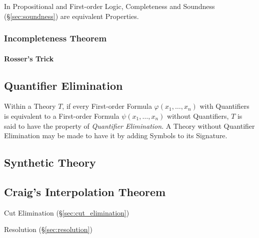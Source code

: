 In Propositional and First-order Logic, Completeness and Soundness
(\S\ref{sec:soundness}) are equivalent Properties.



\subsubsection{Incompleteness Theorem}\label{sec:incompleteness_theorem}

\paragraph{Rosser's Trick}\label{sec:rossers_trick}\hfill



\subsection{Quantifier Elimination}\label{sec:quantifier_elimination}

Within a Theory $T$, if every First-order Formula $\varphi(x_1,
\ldots, x_n)$ with Quantifiers is equivalent to a First-order Formula
$\psi(x_1, \ldots, x_n)$ without Quantifiers, $T$ is said to have the
property of \emph{Quantifier Elimination}. A Theory without Quantifier
Elimination may be made to have it by adding Symbols to its Signature.



\subsection{Synthetic Theory}\label{sec:synthetic_theory}

\subsection{Craig's Interpolation Theorem}
\label{sec:interpolation_theorem}

Cut Elimination (\S\ref{sec:cut_elimination})

Resolution (\S\ref{sec:resolution})



